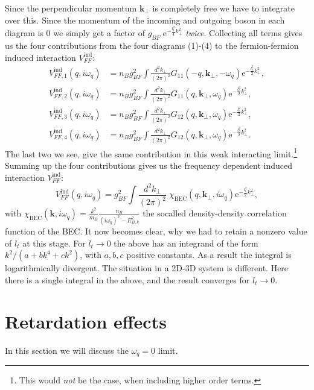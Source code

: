 Since the perpendicular momentum $\mathbf{k}_\perp$ is completely free we have to integrate over this. Since the momentum of the incoming and outgoing boson in each diagram is 0 we simply get a factor of $g_{BF}\; \text{e}^{-\frac{l_t^2}{4}k_\perp^2}$ \textit{twice}. Collecting all terms gives us the four contributions from the four diagrams (1)-(4) to the fermion-fermion induced interaction $V_{FF}^\text{ind}$: 
\begin{align}
V_{FF,1}^\text{ind}(q,i\omega_q) &= n_Bg_{BF}^2\int\frac{d^2k_\perp}{(2\pi)^2}G_{11}(-q,\mathbf{k}_\perp,-\omega_q)\text{e}^{-\frac{l_t^2}{2}k_\perp^2}, \nonumber \\
V_{FF,2}^\text{ind}(q,i\omega_q) &= n_Bg_{BF}^2\int\frac{d^2k_\perp}{(2\pi)^2}G_{11}(q,\mathbf{k}_\perp,\omega_q)\text{e}^{-\frac{l_t^2}{2}k_\perp^2}, \nonumber \\
V_{FF,3}^\text{ind}(q,i\omega_q) &= n_Bg_{BF}^2\int\frac{d^2k_\perp}{(2\pi)^2}G_{12}(q,\mathbf{k}_\perp,\omega_q)\text{e}^{-\frac{l_t^2}{2}k_\perp^2}, \nonumber \\
V_{FF,4}^\text{ind}(q,i\omega_q) &= n_Bg_{BF}^2\int\frac{d^2k_\perp}{(2\pi)^2}G_{12}(q,\mathbf{k}_\perp,\omega_q)\text{e}^{-\frac{l_t^2}{2}k_\perp^2}. 
\end{align}
The last two we see, give the same contribution in this weak interacting limit.\footnote{This would \textit{not} be the case, when including higher order terms.} Summing up the four contributions gives us the frequency dependent induced interaction $V_{FF}^\text{ind}$:
\begin{equation}
V_{FF}^\text{ind}(q,i\omega_q) = g_{BF}^2\int\frac{d^2k_\perp}{(2\pi)^2}\; \chi_\text{BEC}(q,\mathbf{k}_\perp,i\omega_q)\text{e}^{-\frac{l_t^2}{2}k_\perp^2}, 
\label{eq.VFFindXBEC}
\end{equation}
with $\chi_\text{BEC}(\mathbf{k},i\omega_q) = \frac{k^2}{m_B}\frac{n_B}{(i\omega_q)^2-E_{B,k}^2}$ the socalled density-density correlation function of the BEC. It now becomes clear, why we had to retain a nonzero value of $l_t$ at this stage. For $l_t\to 0$ the above has an integrand of the form $k^2/(a+bk^4+ck^2)$, with $a,b,c$ positive constants. As a result the integral is logarithmically divergent. The situation in a 2D-3D system is different. Here there is a single integral in the above, and the result converges for $l_t\to 0$. 

\section{Retardation effects} \label{sec.RetardationEffects}
In this section we will discuss the $\omega_q = 0$ limit. 

